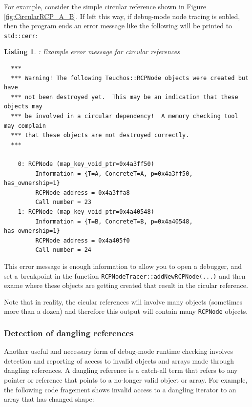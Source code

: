 \documentclass[pdf,ps2pdf,11pt]{SANDreport}
\newtheorem{listing}{Listing}
\begin{document}
For example, consider the simple circular reference shown in Figure
{}\ref{fig:CircularRCP_A_B}.  If left this way, if debug-mode node
tracing is enbled, then the program ends an error message like the
following will be printed to {}\texttt{std::cerr}:

\begin{listing}: Example error message for circular references \\
\label{listing:curcular-ref-error-msg}
{\small\begin{verbatim}
  ***
  *** Warning! The following Teuchos::RCPNode objects were created but have
  *** not been destroyed yet.  This may be an indication that these objects may
  *** be involved in a circular dependency!  A memory checking tool may complain
  *** that these objects are not destroyed correctly.
  ***
  
    0: RCPNode (map_key_void_ptr=0x4a3ff50)
         Information = {T=A, ConcreteT=A, p=0x4a3ff50, has_ownership=1}
         RCPNode address = 0x4a3ffa8
         Call number = 23
    1: RCPNode (map_key_void_ptr=0x4a40548)
         Information = {T=B, ConcreteT=B, p=0x4a40548, has_ownership=1}
         RCPNode address = 0x4a405f0
         Call number = 24
\end{verbatim}}
\end{listing}

This error message is enough information to allow you to open a
debugger, and set a breakpoint in the function
{}\texttt{RCPNodeTracer::addNewRCPNode(...)} and then exame where
these objects are getting created that result in the cicular
reference.

Note that in reality, the cicular references will involve many objects
(sometimes more than a dozen) and therefore this output will contain
many {}\texttt{RCPNode} objects.


%
{}\subsubsection{Detection of dangling references}
\label{sec:detection-dangling-references}
%

Another useful and necessary form of debug-mode runtime checking
involves detection and reporting of access to invalid objects and
arrays made through dangling references.  A dangling reference is a
catch-all term that refers to any pointer or reference that points to
a no-longer valid object or array.  For example, the following code
fragement shows invalid access to a dangling iterator to an array that
has changed shape:
\end{document}
